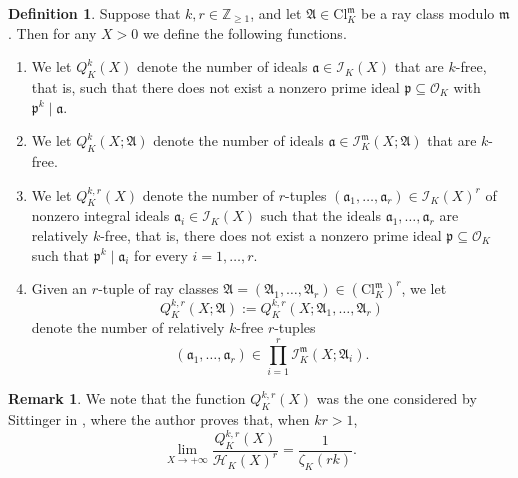 \documentclass[11pt, reqno]{amsart}
\numberwithin{equation}{section}
\newcommand{\Z}{\mathbb{Z}}
\theoremstyle{definition}
\newtheorem{remark}[theorem]{Remark}
\newtheorem{definition}[theorem]{Definition}
\begin{document}
\begin{definition}
Suppose that $k, r \in \Z_{\geq 1}$, and let $\mathfrak{A} \in \mathrm{Cl}_K^{\mathfrak{m}}$ be a ray class modulo $\mathfrak{m}$.
Then for any $X > 0$ we define the following functions.
\begin{enumerate}
    \item We let $Q_K^{k}(X)$ denote the number of ideals $\mathfrak{a} \in \mathcal{I}_K(X)$ that are $k$-free, that is, such that there does not exist a nonzero prime ideal $\mathfrak{p} \subseteq \mathcal{O}_K$ with $\mathfrak{p}^k \mid \mathfrak{a}$.
    
    \item We let $Q_K^{k}(X; \mathfrak{A})$ denote the number of ideals $\mathfrak{a} \in \mathcal{I}_K^{\mathfrak{m}}(X; \mathfrak{A})$ that are $k$-free.

    
    \item We let $Q_K^{k, r}(X)$ denote the number of $r$-tuples $(\mathfrak{a}_1, \dots, \mathfrak{a}_r) \in \mathcal{I}_K(X)^r$ of nonzero integral ideals $\mathfrak{a}_i \in \mathcal{I}_K(X)$ such that the ideals $\mathfrak{a}_1, \dots, \mathfrak{a}_r$ are relatively $k$-free, that is, there does not exist a nonzero prime ideal $\mathfrak{p} \subseteq \mathcal{O}_K$ such that $\mathfrak{p}^k \mid \mathfrak{a}_i$ for every $i = 1, \dots, r$.

    \item Given an $r$-tuple of ray classes $\boldsymbol{\mathfrak{A}} = (\mathfrak{A}_1,\dots,\mathfrak{A}_r) \in \left(\mathrm{Cl}_K^{\mathfrak{m}}\right)^r$, we let
    \[
    Q_K^{k,r}(X; \boldsymbol{\mathfrak{A}}) := Q_K^{k,r}(X;\mathfrak{A}_1,\dots,\mathfrak{A}_r)
    \]
    denote the number of relatively $k$-free $r$-tuples
    \[
    (\mathfrak{a}_1,\dots,\mathfrak{a}_r)
    \in
    \prod_{i=1}^r
    \mathcal{I}_K^{\mathfrak{m}}(X;\mathfrak{A}_i).
    \]


\end{enumerate}
\end{definition}


\begin{remark}
We note that the function $Q_K^{k, r}(X)$ was the one considered by Sittinger in \cite{Sit10}, where the author proves that, when $kr > 1$,
\begin{equation}
    \label{eqn:sittinger}
    \lim_{X \to +\infty} \frac{Q_K^{k,r}(X)}{\mathcal{H}_K(X)^r} = \frac{1}{\zeta_K(rk)}.
\end{equation}
\end{remark}
\end{document}
